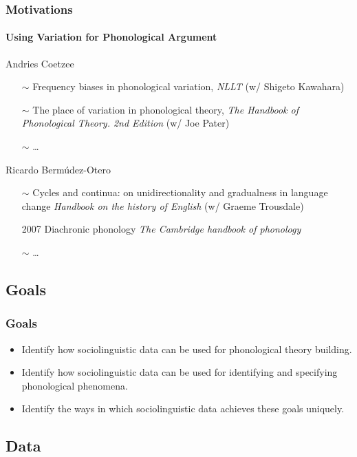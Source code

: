 \documentclass[]{beamer}
\begin{document}
\begin{frame}
	\frametitle{Motivations}
	\framesubtitle{Using Variation for Phonological Argument}
	
	\begin{block}{Andries Coetzee}
		\begin{itemize}
			\item [$\sim$] Frequency biases in phonological variation, {\it NLLT} (w/ Shigeto Kawahara)
			\item [$\sim$] The place of variation in phonological theory, {\it The Handbook of Phonological Theory. 2nd Edition} (w/ Joe Pater)
			\item [$\sim$] \ldots
		\end{itemize}	
	\end{block}
	
	\begin{block}{Ricardo Berm\'udez-Otero}
		\begin{itemize}
			\item [$\sim$] Cycles and continua: on unidirectionality and gradualness in language change {\it Handbook on the history of English} (w/ Graeme Trousdale)
			\item [2007] Diachronic phonology {\it The Cambridge handbook of phonology}
			\item [$\sim$] \ldots
		\end{itemize}
	\end{block}
\end{frame}


\subsection{Goals}

\begin{frame}
	\frametitle{Goals}
	
	\begin{itemize}
		\item Identify how sociolinguistic data can be used for phonological theory building.
		\item Identify how sociolinguistic data can be used for identifying and specifying phonological phenomena.
		\item Identify the ways in which sociolinguistic data achieves these goals uniquely.
	\end{itemize}

\end{frame}

\subsection{Data}
\end{document}

